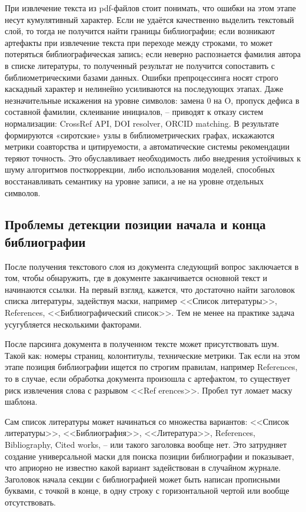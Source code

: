 При извлечение текста из pdf-файлов стоит понимать, что ошибки на этом этапе несут кумулятивный характер\cite{tkaczyk2015cermine}. Если не удаётся качественно выделить текстовый слой, то тогда не получится найти границы библиографии; если возникают артефакты при извлечение текста при переходе между строками, то может потеряться библиографическая запись; если неверно распознается фамилия автора в списке литературы, то полученный результат не получится сопоставить с библиометрическими базами данных. Ошибки препроцессинга носят строго каскадный характер и нелинейно усиливаются на последующих этапах. Даже незначительные искажения на уровне символов: замена 0 на O, пропуск дефиса в составной фамилии, склеивание инициалов, -- приводят к отказу систем нормализации: CrossRef API, DOI resolver, ORCID matching. В результате формируются «сиротские» узлы в библиометрических графах, искажаются метрики соавторства и цитируемости, а автоматические системы рекомендации теряют точность. Это обуславливает необходимость либо внедрения устойчивых к шуму алгоритмов посткоррекции, либо использования моделей, способных восстанавливать семантику на уровне записи, а не на уровне отдельных символов.

\subsection{Проблемы детекции позиции начала и конца библиографии}

После получения текстового слоя из документа следующий вопрос заключается в том, чтобы обнаружить, где в документе заканчивается основной текст и начинаются ссылки. На первый взгляд, кажется, что достаточно найти заголовок списка литературы, задействуя маски, например <<Список литературы>>, References, <<Библиографический список>>. Тем не менее на практике задача усугубляется несколькими факторами.

После парсинга документа в полученном тексте может присутствовать шум. Такой как: номеры страниц, колонтитулы, технические метрики. Так если на этом этапе позиция библиографии ищется по строгим правилам, например References, то в случае, если обработка документа произошла с артефактом, то существует риск извлечения слова с разрывом <<Ref erences>>. Пробел тут ломает маску шаблона\cite{tellez2005machine}.

Сам список литературы может начинаться со множества вариантов: <<Список литературы>>, <<Библиография>>, <<Литература>>, References, Bibliography, Cited works, -- или такого заголовка вообще нет. Это затрудняет создание универсальной маски для поиска позиции библиографии и показывает, что априорно не известно какой вариант задействован в случайном журнале\cite{tkaczyk2015cermine}. Заголовок начала секции с библиографией может быть написан прописными буквами, с точкой в конце, в одну строку с горизонтальной чертой или вообще отсутствовать.

